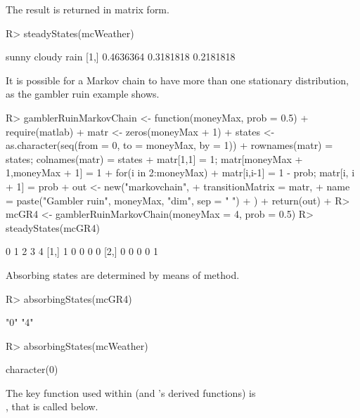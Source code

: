 \documentclass[nojss]{jss}
\begin{document}
The result is returned in matrix form.

\begin{Schunk}
\begin{Sinput}
R> steadyStates(mcWeather)
\end{Sinput}
\begin{Soutput}
         sunny    cloudy      rain
[1,] 0.4636364 0.3181818 0.2181818
\end{Soutput}
\end{Schunk}

It is possible for a Markov chain to have more than one stationary distribution, as the gambler ruin example shows.

\begin{Schunk}
\begin{Sinput}
R> gamblerRuinMarkovChain <- function(moneyMax, prob = 0.5) {
+    require(matlab)
+    matr <- zeros(moneyMax + 1)
+    states <- as.character(seq(from = 0, to = moneyMax, by = 1))
+    rownames(matr) = states; colnames(matr) = states
+    matr[1,1] = 1; matr[moneyMax + 1,moneyMax + 1] = 1
+    for(i in 2:moneyMax)
+    { matr[i,i-1] = 1 - prob; matr[i, i + 1] = prob   }
+    out <- new("markovchain",  
+             transitionMatrix = matr, 
+             name = paste("Gambler ruin", moneyMax, "dim", sep = " ")
+             )
+    return(out)
+  }
R> mcGR4 <- gamblerRuinMarkovChain(moneyMax = 4, prob = 0.5)
R> steadyStates(mcGR4)
\end{Sinput}
\begin{Soutput}
     0 1 2 3 4
[1,] 1 0 0 0 0
[2,] 0 0 0 0 1
\end{Soutput}
\end{Schunk}

Absorbing states are determined by means of  method.

\begin{Schunk}
\begin{Sinput}
R> absorbingStates(mcGR4)
\end{Sinput}
\begin{Soutput}
[1] "0" "4"
\end{Soutput}
\begin{Sinput}
R> absorbingStates(mcWeather)
\end{Sinput}
\begin{Soutput}
character(0)
\end{Soutput}
\end{Schunk}

The key function used within \cite{renaldoMatlab} (and 's
derived functions) is \\ , that is called below.
\end{document}
